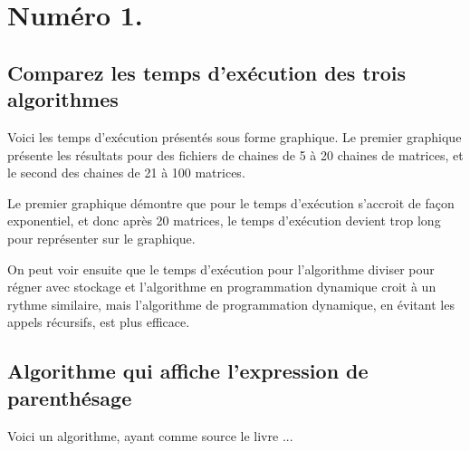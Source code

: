 \documentclass[10.9pt]{article} %
\begin{document}

\tableofcontents %

\newpage %



\section{Numéro 1.}

\subsection{Comparez les temps d'exécution des trois algorithmes}

Voici les temps d'exécution présentés sous forme graphique. Le premier
graphique présente les résultats pour des fichiers de chaines de 5 à 20 
chaines de matrices, et le second des chaines de 21 à 100 matrices.

Le premier graphique démontre que pour le temps d'exécution s'accroit
de façon exponentiel, et donc après 20 matrices, le temps d'exécution
devient trop long pour représenter sur le graphique.

On peut voir ensuite que le temps d'exécution pour l'algorithme diviser
pour régner avec stockage et l'algorithme en programmation dynamique
croit à un rythme similaire, mais l'algorithme de programmation
dynamique, en évitant les appels récursifs, est plus efficace.


\subsection{Algorithme qui affiche l'expression de parenthésage}

Voici un algorithme, ayant comme source le livre ...

\begin{algorithm}
\end{algorithm}
\end{document}
